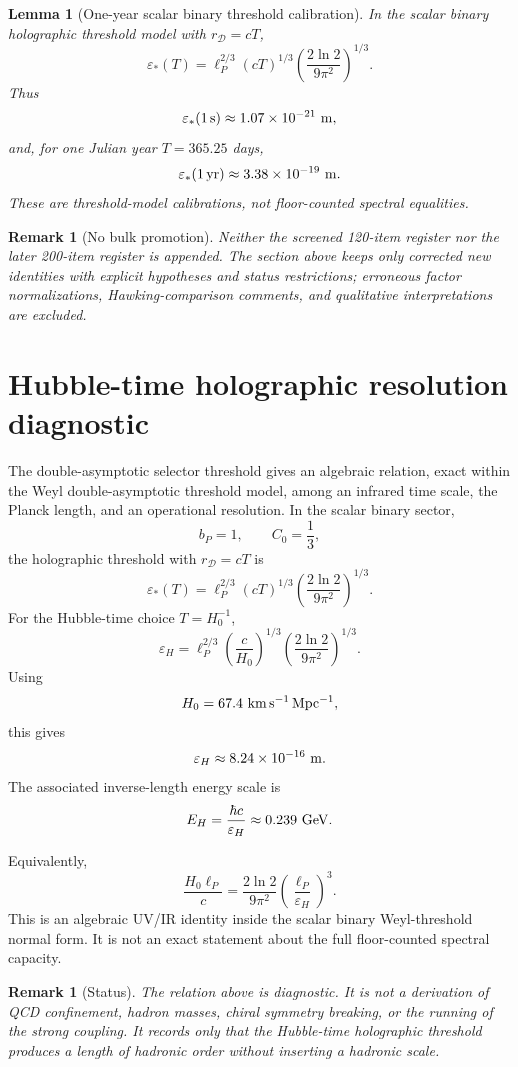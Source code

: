 \documentclass[11pt,a4paper]{article}
\newtheorem{lemma}[theorem]{Lemma}
\newtheorem{remark}[theorem]{Remark}
\begin{document}
\begin{lemma}[One-year scalar binary threshold calibration]
In the scalar binary holographic threshold model with \(r_{\mathcal D}=cT\),
\[
\varepsilon_*(T)
=
\ell_P^{2/3}(cT)^{1/3}
\left(\frac{2\ln2}{9\pi^2}\right)^{1/3}.
\]
Thus
\[
\varepsilon_*(1\,{\rm s})\approx1.07\times10^{-21}\ {\rm m},
\]
and, for one Julian year \(T=365.25\) days,
\[
\varepsilon_*(1\,{\rm yr})\approx3.38\times10^{-19}\ {\rm m}.
\]
These are threshold-model calibrations, not floor-counted spectral equalities.
\end{lemma}


\begin{remark}[No bulk promotion]
Neither the screened 120-item register nor the later 200-item register is appended.  The section above keeps only corrected new identities with explicit hypotheses and status restrictions; erroneous factor normalizations, Hawking-comparison comments, and qualitative interpretations are excluded.
\end{remark}




\section{Hubble-time holographic resolution diagnostic}
\label{app:hubble-time-resolution-diagnostic}

The double-asymptotic selector threshold gives an algebraic relation, exact within the Weyl double-asymptotic threshold model, among an infrared time scale, the Planck length, and an operational resolution.  In the scalar binary sector,
\[
b_P=1,
\qquad
C_0=\frac13,
\]
the holographic threshold with \(r_{\mathcal D}=cT\) is
\[
\varepsilon_*(T)
=
\ell_P^{2/3}(cT)^{1/3}
\left(\frac{2\ln2}{9\pi^2}\right)^{1/3}.
\]
For the Hubble-time choice \(T=H_0^{-1}\),
\[
\varepsilon_H
=
\ell_P^{2/3}
\left(\frac{c}{H_0}\right)^{1/3}
\left(\frac{2\ln2}{9\pi^2}\right)^{1/3}.
\]
Using
\[
H_0=67.4\ {\rm km\,s^{-1}\,Mpc^{-1}},
\]
this gives
\[
\varepsilon_H\approx8.24\times10^{-16}\ {\rm m}.
\]
The associated inverse-length energy scale is
\[
E_H=\frac{\hbar c}{\varepsilon_H}
\approx0.239\ {\rm GeV}.
\]

Equivalently,
\[
\frac{H_0\ell_P}{c}
=
\frac{2\ln2}{9\pi^2}
\left(\frac{\ell_P}{\varepsilon_H}\right)^3.
\]
This is an algebraic UV/IR identity inside the scalar binary Weyl-threshold normal form.  It is not an exact statement about the full floor-counted spectral capacity.

\begin{remark}[Status]
The relation above is diagnostic.  It is not a derivation of QCD confinement, hadron masses, chiral symmetry breaking, or the running of the strong coupling.  It records only that the Hubble-time holographic threshold produces a length of hadronic order without inserting a hadronic scale.
\end{remark}
\end{document}
